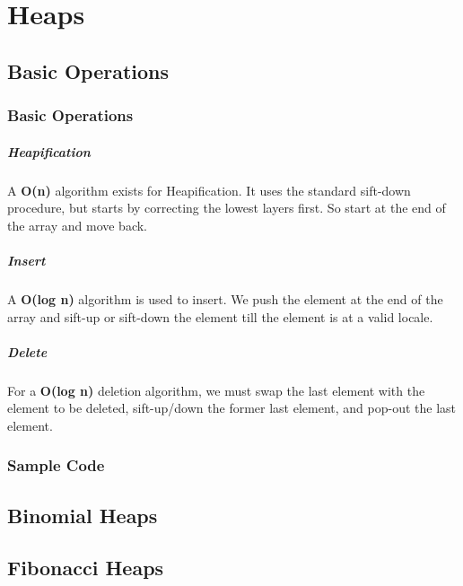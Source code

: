 \chapter{Heaps}



\section{Basic Operations}


\subsection{Basic Operations}

\paragraph{Heapification}
A \textbf{O(n)} algorithm exists for Heapification. It uses the standard sift-down procedure, but starts by correcting the lowest layers first. So start at the end of the array and move back.

\paragraph{Insert}
A \textbf{O(log n)} algorithm is used to insert. We push the element at the end of the array and sift-up or sift-down the element till the element is at a valid locale. 

\paragraph{Delete}
For a \textbf{O(log n)} deletion algorithm, we must swap the last element with the element to be deleted, sift-up/down the former last element, and pop-out the last element. 


\subsection{Sample Code}





\section{Binomial Heaps}



\section{Fibonacci Heaps}
